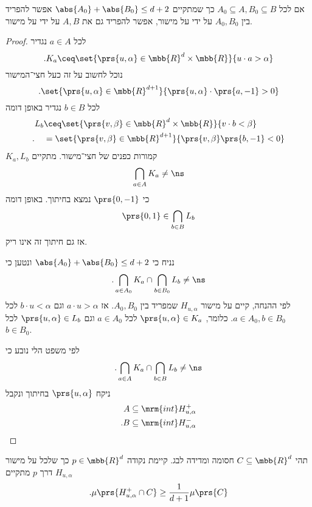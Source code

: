 \documentclass[a4paper,10pt,twoside,openany]{book}
\begin{document}
\begin{theorem}[קירכנברגר]
אם לכל
$A_0 \subseteq A, B_0 \subseteq B$
כך שמתקיים
$\abs{A_0} + \abs{B_0} \leq d+2$
אפשר להפריד בין
$A_0, B_0$
על ידי על מישור, אפשר להפריד גם את
$A,B$
על ידי על מישור.
\end{theorem}

\begin{proof}
לכל
$a \in A$
נגדיר
\[\text{.} K_a \ceq \set{\prs{u,\alpha} \in \mbb{R}^d \times \mbb{R}}{u \cdot a > \alpha}\]
נוכל לחשוב על זה כעל חצי־המישור
\[\text{.} \set{\prs{u,\alpha} \in \mbb{R}^{d+1}}{\prs{u,\alpha} \cdot \prs{a,-1} > 0}\]
לכל
$b \in B$
נגדיר באופן דומה
\begin{align*}
L_b &\ceq \set{\prs{v,\beta} \in \mbb{R}^d \times \mbb{R}}{v \cdot b < \beta}
\\ \text{.} \hphantom{L_b} &= \set{\prs{v,\beta} \in \mbb{R}^{d+1}}{\prs{v,\beta}\prs{b,-1} < 0} 
\end{align*}
$K_a, L_b$
קמורות כפנים של חצי־מישור.
מתקיים
\[\bigcap_{a \in A} K_a \neq \ns\]
כי
$\prs{0,-1}$
נמצא בחיתוך.
באופן דומה
\[\prs{0,1} \in \bigcap_{b \in B} L_b\]
אז גם חיתוך זה אינו ריק.

נניח כי
$\abs{A_0} + \abs{B_0} \leq d+2$
ונטען כי
\begin{align*}
\text{.} \bigcap_{a \in A_0} K_a \cap \bigcap_{b \in B_0} L_b \neq \ns
\end{align*}
לפי ההנחה, קיים על מישור
$H_{u,\alpha}$
שמפריד בין
$A_0, B_0$.
אז
$a \cdot u > \alpha$
וגם
$b \cdot u < \alpha$
לכל
$a \in A_0, b \in B_0$.
כלומר,
$\prs{u,\alpha} \in K_a$
לכל
$a \in A_0$
וגם
$\prs{u,\alpha} \in L_b$
לכל
$b \in B_0$.

לפי משפט הלי נובע כי
\[\text{.} \bigcap_{a \in A} K_a \cap \bigcap_{b \in B} L_b \neq \ns\]
ניקח
$\prs{u,\alpha}$
בחיתוך ונקבל
\begin{align*}
A &\subseteq \mrm{int} H_{u,\alpha}^+ \\
\text{.} B &\subseteq \mrm{int} H_{u,\alpha}^-
\end{align*}
\end{proof}

\begin{theorem}[רדו]
תהי
$C \subseteq \mbb{R}^d$
חסומה ומדידה לבג.
קיימת נקודה
$p \in \mbb{R}^d$
כך שלכל על מישור
$H_{u,\alpha}$
דרך
$p$
מתקיים
\[\text{.} \mu\prs{H_{u,\alpha}^+ \cap C} \geq \frac{1}{d+1} \mu\prs{C}\]
\end{theorem}
\end{document}
